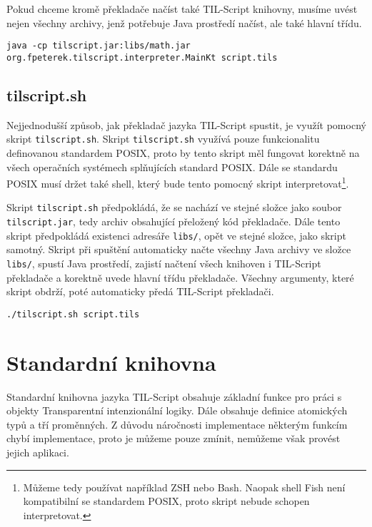 Pokud chceme kromě překladače načíst také TIL-Script knihovny, musíme uvést nejen všechny archivy,
jenž potřebuje Java prostředí načíst, ale také hlavní třídu.

\begin{lstlisting}[caption={Spuštění překladače s načtením knihoven}]
java -cp tilscript.jar:libs/math.jar org.fpeterek.tilscript.interpreter.MainKt script.tils
\end{lstlisting}

\subsection{tilscript.sh}

Nejjednodušší způsob, jak překladač jazyka TIL-Script spustit, je využít pomocný skript
\lstinline{tilscript.sh}. Skript \lstinline{tilscript.sh} využívá pouze funkcionalitu definovanou
standardem POSIX, proto by tento skript měl fungovat korektně na všech operačních systémech
splňujících standard POSIX. Dále se standardu POSIX musí držet také shell, který bude tento pomocný
skript interpretovat\footnote{Můžeme tedy používat například ZSH nebo Bash. Naopak shell Fish není
kompatibilní se standardem POSIX, proto skript nebude schopen interpretovat.}.

Skript \lstinline{tilscript.sh} předpokládá, že se nachází ve stejné složce jako soubor
\lstinline{tilscript.jar}, tedy archiv obsahující přeložený kód překladače. Dále tento skript
předpokládá existenci adresáře \lstinline{libs/}, opět ve stejné složce, jako skript samotný.
Skript při spuštění automaticky načte všechny Java archivy ve složce \lstinline{libs/}, spustí
Java prostředí, zajistí načtení všech knihoven i TIL-Script překladače a korektně uvede hlavní
třídu překladače. Všechny argumenty, které skript obdrží, poté automaticky předá TIL-Script
překladači.

\begin{lstlisting}[caption={Spuštění překladače za využití pomocného skriptu}]
./tilscript.sh script.tils
\end{lstlisting}

\section{Standardní knihovna}\label{stdlib-doc}

Standardní knihovna jazyka TIL-Script obsahuje základní funkce pro práci s objekty Transparentní
intenzionální logiky. Dále obsahuje definice atomických typů a tří proměnných. Z důvodu náročnosti
implementace některým funkcím chybí implementace, proto je můžeme pouze zmínit, nemůžeme však
provést jejich aplikaci.

